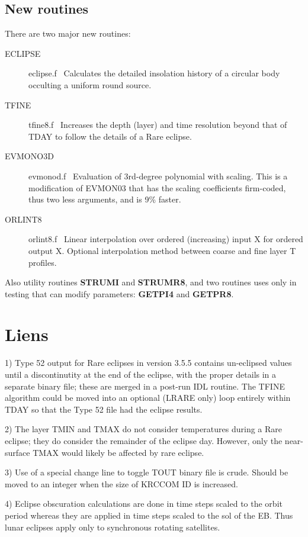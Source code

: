 \documentclass{article}
\begin{document}
\subsection{New routines} 

There are two major new routines:
\begin{description}  %
 \item [ECLIPSE] eclipse.f  \ Calculates the detailed insolation history of a circular body occulting a uniform round source.  

\item [TFINE] tfine8.f  \ Increases the depth (layer) and time resolution beyond that of TDAY to follow the details of a Rare eclipse.  

\item [EVMONO3D] evmonod.f \ Evaluation of 3rd-degree polynomial with
  scaling. This is a modification of EVMON03 that has the scaling coefficients
  firm-coded, thus two less arguments, and is 9\% faster.

\item[ORLINT8] orlint8.f \ Linear interpolation over ordered (increasing) input X  for ordered  output X. Optional interpolation method between coarse and fine layer T profiles.
\end{description}

 Also utility routines \textbf{STRUMI} and \textbf{STRUMR8}, and two routines
 uses only in testing that can modify parameters: \textbf{GETPI4} and
 \textbf{GETPR8}.

\section{Liens}
1)  Type 52 output for Rare eclipses in version 3.5.5 contains un-eclipsed
values until a discontinutity at the end of the eclipse, with the proper details
in a separate binary file; these are merged in a post-run IDL routine. The TFINE
algorithm could be moved into an optional (LRARE only) loop entirely within TDAY
so that the Type 52 file had the eclipse results.

2) The layer TMIN and TMAX do not consider temperatures during a Rare eclipse; they
do consider the remainder of the eclipse day. However, only the near-surface
TMAX would likely be affected by rare eclipse.

3) Use of a special change line to toggle TOUT binary file is crude. Should be
moved to an integer when the size of KRCCOM ID is increased.

4) Eclipse obscuration calculations are done in time steps scaled to the orbit
period whereas they are applied in time steps scaled to the sol of the EB. Thus
lunar eclipses apply only to synchronous rotating satellites.
\end{document}
